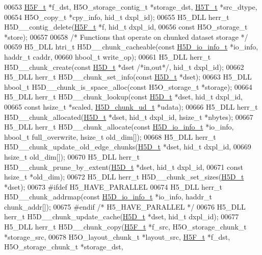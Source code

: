 \begin{DoxyCode}
00653     \hyperlink{struct_h5_f__t}{H5F\_t} *f\_dst, H5O\_storage\_contig\_t *storage\_dst, \hyperlink{struct_h5_t__t}{H5T\_t} *src\_dtype,
00654     H5O\_copy\_t *cpy\_info, hid\_t dxpl\_id);
00655 H5\_DLL herr\_t H5D\_\_contig\_delete(\hyperlink{struct_h5_f__t}{H5F\_t} *f, hid\_t dxpl\_id,
00656     \textcolor{keyword}{const} H5O\_storage\_t *store);
00657 
00658 \textcolor{comment}{/* Functions that operate on chunked dataset storage */}
00659 H5\_DLL htri\_t H5D\_\_chunk\_cacheable(\textcolor{keyword}{const} \hyperlink{struct_h5_d__io__info__t}{H5D\_io\_info\_t} *io\_info, haddr\_t caddr,
00660     hbool\_t write\_op);
00661 H5\_DLL herr\_t H5D\_\_chunk\_create(\textcolor{keyword}{const} \hyperlink{struct_h5_d__t}{H5D\_t} *dset \textcolor{comment}{/*in,out*/}, hid\_t dxpl\_id);
00662 H5\_DLL herr\_t H5D\_\_chunk\_set\_info(\textcolor{keyword}{const} \hyperlink{struct_h5_d__t}{H5D\_t} *dset);
00663 H5\_DLL hbool\_t H5D\_\_chunk\_is\_space\_alloc(\textcolor{keyword}{const} H5O\_storage\_t *storage);
00664 H5\_DLL herr\_t H5D\_\_chunk\_lookup(\textcolor{keyword}{const} \hyperlink{struct_h5_d__t}{H5D\_t} *dset, hid\_t dxpl\_id,
00665     \textcolor{keyword}{const} hsize\_t *scaled, \hyperlink{struct_h5_d__chunk__ud__t}{H5D\_chunk\_ud\_t} *udata);
00666 H5\_DLL herr\_t H5D\_\_chunk\_allocated(\hyperlink{struct_h5_d__t}{H5D\_t} *dset, hid\_t dxpl\_id, hsize\_t *nbytes);
00667 H5\_DLL herr\_t H5D\_\_chunk\_allocate(\textcolor{keyword}{const} \hyperlink{struct_h5_d__io__info__t}{H5D\_io\_info\_t} *io\_info, hbool\_t full\_overwrite, 
      hsize\_t old\_dim[]);
00668 H5\_DLL herr\_t H5D\_\_chunk\_update\_old\_edge\_chunks(\hyperlink{struct_h5_d__t}{H5D\_t} *dset, hid\_t dxpl\_id,
00669     hsize\_t old\_dim[]);
00670 H5\_DLL herr\_t H5D\_\_chunk\_prune\_by\_extent(\hyperlink{struct_h5_d__t}{H5D\_t} *dset, hid\_t dxpl\_id,
00671     \textcolor{keyword}{const} hsize\_t *old\_dim);
00672 H5\_DLL herr\_t H5D\_\_chunk\_set\_sizes(\hyperlink{struct_h5_d__t}{H5D\_t} *dset);
00673 \textcolor{preprocessor}{#ifdef H5\_HAVE\_PARALLEL}
00674 H5\_DLL herr\_t H5D\_\_chunk\_addrmap(\textcolor{keyword}{const} \hyperlink{struct_h5_d__io__info__t}{H5D\_io\_info\_t} *io\_info, haddr\_t chunk\_addr[]);
00675 \textcolor{preprocessor}{#endif }\textcolor{comment}{/* H5\_HAVE\_PARALLEL */}\textcolor{preprocessor}{}
00676 H5\_DLL herr\_t H5D\_\_chunk\_update\_cache(\hyperlink{struct_h5_d__t}{H5D\_t} *dset, hid\_t dxpl\_id);
00677 H5\_DLL herr\_t H5D\_\_chunk\_copy(\hyperlink{struct_h5_f__t}{H5F\_t} *f\_src, H5O\_storage\_chunk\_t *storage\_src,
00678     H5O\_layout\_chunk\_t *layout\_src, \hyperlink{struct_h5_f__t}{H5F\_t} *f\_dst, H5O\_storage\_chunk\_t *storage\_dst,

\end{DoxyCode}
